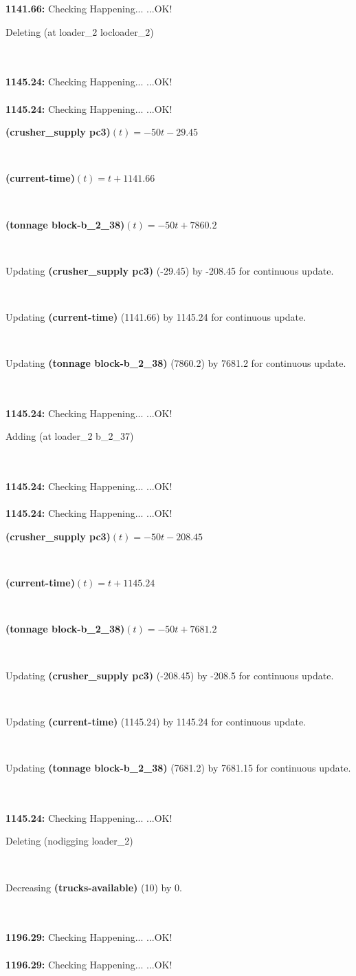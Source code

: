 \documentclass[a4paper,12pt]{article}
\newcommand{\atime}[1]{{\bf #1:}}
\newcommand{\exprn}[1]{{\sf #1}}
\newcommand{\fexprn}[1]{{\small {\bf #1}}}
\newcommand{\checkhappening}{Checking Happening... }
\newcommand{\listrow}[1]{\begin{minipage}[t]{11.5cm} #1 \end{minipage}}
\newcommand{\happeningOK}{...OK!}
\newcommand{\assignmentcts}[3]{\listrow{Updating \fexprn{#1} (#2) by #3 for continuous update.}}
\newcommand{\decrease}[3]{\listrow{Decreasing \fexprn{#1} (#2) by #3.}}
\newcommand{\function}[2]{\listrow{\fexprn{#1}$(t) = #2$}}
\newcommand{\adding}[1]{\listrow{Adding \exprn{#1} }}
\newcommand{\deleting}[1]{\listrow{Deleting \exprn{#1} }}
\begin{document}
\begin{tabbing}
\atime{1141.66} \> \checkhappening\happeningOK\\
 \> \deleting{(at loader\_2 locloader\_2)}\\
\\
\atime{1145.24} \> \checkhappening\happeningOK\\
\\
\atime{1145.24} \> \checkhappening\happeningOK\\
 \> \function{(crusher\_supply pc3)}{ - 50t - 29.45}\\
 \> \function{(current-time)}{t + 1141.66}\\
 \> \function{(tonnage block-b\_2\_38)}{ - 50t + 7860.2}\\
 \> \assignmentcts{(crusher\_supply pc3)}{-29.45}{-208.45}\\
 \> \assignmentcts{(current-time)}{1141.66}{1145.24}\\
 \> \assignmentcts{(tonnage block-b\_2\_38)}{7860.2}{7681.2}\\
\\
\atime{1145.24} \> \checkhappening\happeningOK\\
 \> \adding{(at loader\_2 b\_2\_37)}\\
\\
\atime{1145.24} \> \checkhappening\happeningOK\\
\\
\atime{1145.24} \> \checkhappening\happeningOK\\
 \> \function{(crusher\_supply pc3)}{ - 50t - 208.45}\\
 \> \function{(current-time)}{t + 1145.24}\\
 \> \function{(tonnage block-b\_2\_38)}{ - 50t + 7681.2}\\
 \> \assignmentcts{(crusher\_supply pc3)}{-208.45}{-208.5}\\
 \> \assignmentcts{(current-time)}{1145.24}{1145.24}\\
 \> \assignmentcts{(tonnage block-b\_2\_38)}{7681.2}{7681.15}\\
\\
\atime{1145.24} \> \checkhappening\happeningOK\\
 \> \deleting{(nodigging loader\_2)}\\
 \> \decrease{(trucks-available)}{10}{0}\\
\\
\atime{1196.29} \> \checkhappening\happeningOK\\
\\
\atime{1196.29} \> \checkhappening\happeningOK\\

\end{tabbing}
\end{document}
